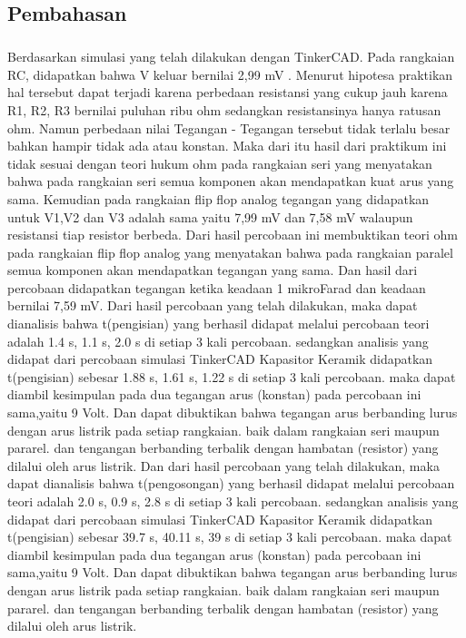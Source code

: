 \documentclass[12pt,a4paper]{article}
\begin{document}
\subsection{Pembahasan}
\subparagraph{}
	Berdasarkan simulasi yang telah dilakukan dengan TinkerCAD. Pada rangkaian RC, didapatkan bahwa V keluar bernilai 2,99 mV . Menurut hipotesa praktikan hal tersebut dapat terjadi karena perbedaan resistansi yang cukup jauh karena R1, R2, R3 bernilai puluhan ribu ohm sedangkan resistansinya hanya ratusan ohm. Namun perbedaan nilai Tegangan - Tegangan tersebut tidak terlalu besar bahkan hampir tidak ada atau konstan. Maka dari itu hasil dari praktikum ini tidak sesuai dengan teori hukum ohm pada rangkaian seri yang menyatakan bahwa pada rangkaian seri semua komponen akan mendapatkan kuat arus yang sama.
	Kemudian pada rangkaian flip flop analog tegangan yang didapatkan untuk V1,V2 dan V3 adalah sama yaitu 7,99 mV dan 7,58 mV walaupun resistansi tiap resistor berbeda. Dari hasil percobaan ini membuktikan teori ohm pada rangkaian flip flop analog yang menyatakan bahwa pada rangkaian paralel semua komponen akan mendapatkan tegangan yang sama. Dan hasil dari percobaan didapatkan tegangan ketika keadaan 1 mikroFarad dan keadaan bernilai 7,59 mV.
	Dari hasil percobaan yang telah dilakukan, maka dapat dianalisis bahwa t(pengisian) yang berhasil didapat melalui percobaan teori adalah 1.4 s, 1.1 s, 2.0 s di setiap 3 kali percobaan. sedangkan analisis yang didapat dari percobaan simulasi TinkerCAD Kapasitor Keramik didapatkan t(pengisian) sebesar 1.88 s, 1.61 s, 1.22 s di setiap 3 kali percobaan. maka dapat diambil kesimpulan pada dua tegangan arus (konstan) pada percobaan ini sama,yaitu 9 Volt. Dan dapat dibuktikan bahwa tegangan arus berbanding lurus dengan arus listrik pada setiap rangkaian. baik dalam rangkaian seri maupun pararel. dan tengangan berbanding terbalik dengan hambatan (resistor) yang dilalui oleh arus listrik.
	Dan dari hasil percobaan yang telah dilakukan, maka dapat dianalisis bahwa t(pengosongan) yang berhasil didapat melalui percobaan teori adalah 2.0 s, 0.9 s, 2.8 s di setiap 3 kali percobaan. sedangkan analisis yang didapat dari percobaan simulasi TinkerCAD Kapasitor Keramik didapatkan t(pengisian) sebesar 39.7 s, 40.11 s, 39 s di setiap 3 kali percobaan. maka dapat diambil kesimpulan pada dua tegangan arus (konstan) pada percobaan ini sama,yaitu 9 Volt. Dan dapat dibuktikan bahwa tegangan arus berbanding lurus dengan arus listrik pada setiap rangkaian. baik dalam rangkaian seri maupun pararel. dan tengangan berbanding terbalik dengan hambatan (resistor) yang dilalui oleh arus listrik.
\end{document}
